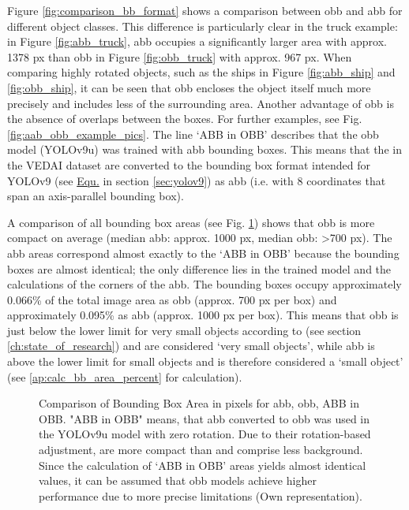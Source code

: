 Figure \ref{fig:comparison_bb_format} shows a comparison between \acrshort{obb} and \acrshort{abb} for different object classes. This difference is particularly clear in the truck example: in Figure \ref{fig:abb_truck}, \acrshort{abb} occupies a significantly larger area with approx. 1378 px than \acrshort{obb} in Figure \ref{fig:obb_truck} with approx. 967 px. When comparing highly rotated objects, such as the ships in Figure \ref{fig:abb_ship} and \ref{fig:obb_ship}, it can be seen that \acrshort{obb} encloses the object itself much more precisely and includes less of the surrounding area. Another advantage of \acrshort{obb} is the absence of overlaps between the boxes. For further examples, see Fig. \ref{fig:aab_obb_example_pics}. The line ‘ABB in OBB’ describes that the \acrshort{obb} model (\acrshort{YOLO}v9u) was trained with \acrshort{abb} bounding boxes. This means that the  in the \acrshort{VEDAI} dataset are converted to the bounding box format intended for \acrshort{YOLO}v9 (see \hyperlink{eq:yolov9u} {Equ.} in section \ref{sec:yolov9}) as \acrshort{abb} (i.e. with 8 coordinates that span an axis-parallel bounding box).
 

A comparison of all bounding box areas (see Fig. \ref{fig:bbox_area}) shows that \acrshort{obb} is more compact on average (median \acrshort{abb}: approx. 1000 px, median \acrshort{obb}: >700 px). The \acrshort{abb} areas correspond almost exactly to the ‘ABB in OBB’ because the bounding boxes are almost identical; the only difference lies in the trained model and the calculations of the corners of the \acrshort{abb}. The bounding boxes occupy approximately 0.066\% of the total image area as \acrshort{obb} (approx. 700 px per box) and approximately 0.095\% as \acrshort{abb} (approx. 1000 px per box). This means that \acrshort{obb} is just below the lower limit for very small objects according to \citeauthor {Chen2017} \cite{Chen2017} (see section \ref{ch:state_of_research}) and are considered ‘very small objects’, while \acrshort{abb} is above the lower limit for small objects and is therefore considered a ‘small object’ (see \ref{ap:calc_bb_area_percent} for calculation).




\begin{figure}[htbp]
    \centering
    
    \caption[Comparison of Bounding Box Area in pixels for \acrshort{abb}, \acrshort{obb}, abb in obb]{Comparison of Bounding Box Area in pixels for \acrshort{abb}, \acrshort{obb}, ABB in OBB. "ABB in OBB" means, that \acrlong{abb} converted to obb was used in the \acrshort{YOLO}v9u model with zero rotation. Due to their rotation-based adjustment,  are more compact than  and comprise less background. Since the calculation of ‘ABB in OBB’ areas yields almost identical values, it can be assumed that \acrshort{obb} models achieve higher performance due to more precise limitations (Own representation).}
    \label{fig:bbox_area}
\end{figure}


